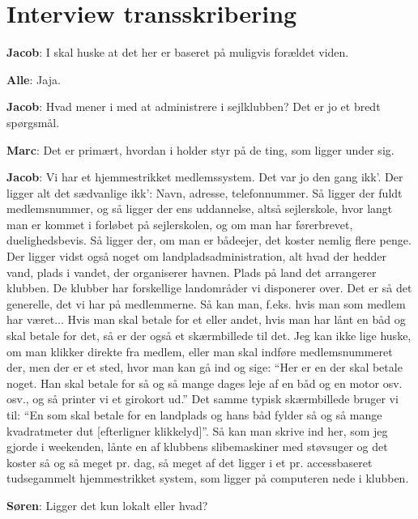 \chapter{Interview transskribering}\label{bilag:interview-transkribering}
\textbf{Jacob}: I skal huske at det her er baseret på muligvis forældet viden.

\textbf{Alle}: Jaja.

\textbf{Jacob}: Hvad mener i med at administrere i sejlklubben? Det er jo et bredt spørgsmål.


\textbf{Marc}: Det er primært, hvordan i holder styr på de ting, som ligger under sig.

\textbf{Jacob}: Vi har et hjemmestrikket medlemssystem.
Det var jo den gang ikk'.
Der ligger alt det sædvanlige ikk': Navn, adresse, telefonnummer.
Så ligger der fuldt medlemsnummer, og så ligger der ens uddannelse, altså sejlerskole, hvor langt man er kommet i forløbet på sejlerskolen, og om man har førerbrevet, duelighedsbevis.
Så ligger der, om man er bådeejer, det koster nemlig flere penge.
Der ligger vidst også noget om landpladsadministration, alt hvad der hedder vand, plads i vandet, der organiserer havnen.
Plads på land det arrangerer klubben.
De klubber har forskellige landområder vi disponerer over.
Det er så det generelle, det vi har på medlemmerne.
Så kan man, f.eks.
hvis man som medlem har været...
Hvis man skal betale for et eller andet, hvis man har lånt en båd og skal betale for det, så er der også et skærmbillede til det.
Jeg kan ikke lige huske, om man klikker direkte fra medlem, eller man skal indføre medlemsnummeret der, men der er et sted, hvor man kan gå ind og sige: ``Her er en der skal betale noget.
Han skal betale for så og så mange dages leje af en båd og en motor osv. osv., og så printer vi et girokort ud.'' Det samme typisk skærmbillede bruger vi til: ``En som skal betale for en landplads og hans båd fylder så og så mange kvadratmeter dut [efterligner klikkelyd]''. 
Så kan man skrive ind her, som jeg gjorde i weekenden, lånte en af klubbens slibemaskiner med støvsuger og det koster så og så meget pr. dag, så meget af det ligger i et pr. accessbaseret tudsegammelt hjemmestrikket system, som ligger på computeren nede i klubben.

\textbf{Søren}: Ligger det kun lokalt eller hvad?

